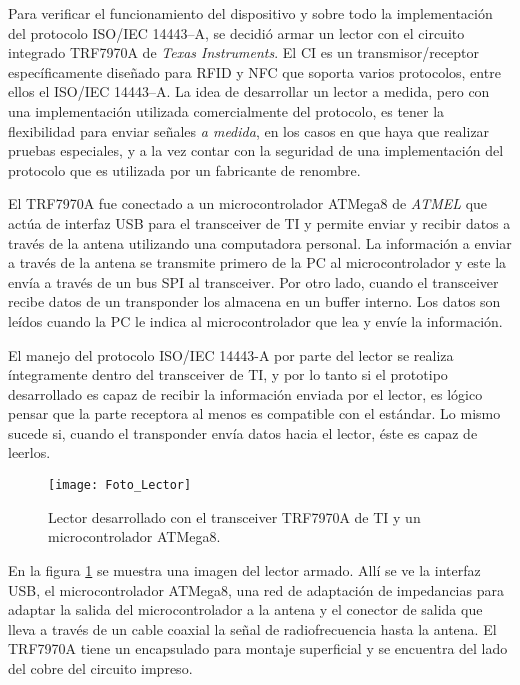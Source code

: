 Para verificar el funcionamiento del dispositivo y sobre todo la 
implementación del protocolo ISO/IEC 14443--A, se decidió armar
un lector con el circuito integrado TRF7970A de \emph{Texas 
Instruments}. El CI es un transmisor/receptor específicamente 
diseñado para RFID y NFC que soporta varios protocolos, entre ellos el 
ISO/IEC 14443--A. La idea de desarrollar un lector a medida, pero 
con una implementación utilizada comercialmente del protocolo, 
es tener la flexibilidad para enviar señales \emph{a medida}, en los 
casos en que haya que realizar pruebas especiales, y a la vez contar 
con la seguridad de una implementación del protocolo que es utilizada 
por un fabricante de renombre.

El TRF7970A fue conectado a un microcontrolador ATMega8 de 
\emph{ATMEL} que actúa de interfaz USB para el transceiver de TI y 
permite enviar y recibir datos a través de la antena utilizando una 
computadora personal. La información a enviar a través de la antena 
se transmite primero de la PC al microcontrolador y este la envía a 
través de un bus SPI al transceiver. Por otro lado, cuando el 
transceiver recibe datos de un transponder los almacena en un buffer 
interno. Los datos son leídos cuando la PC le indica al 
microcontrolador que lea y envíe la información.

El manejo del protocolo ISO/IEC 14443-A por parte del lector se realiza 
íntegramente dentro del transceiver de TI, y por lo tanto si el 
prototipo desarrollado es capaz de recibir la información enviada por 
el lector, es lógico pensar que la parte receptora al menos es 
compatible con el estándar. Lo mismo sucede si, cuando el transponder 
envía datos hacia el lector, éste es capaz de leerlos.

\begin{figure}
	\centering
	\texttt{[image: Foto\_Lector]}
	\caption{Lector desarrollado con el transceiver TRF7970A de TI y 
	un microcontrolador ATMega8.}
	\label{fig:FotoLector}
\end{figure}

En la figura \ref{fig:FotoLector} se muestra una imagen del lector 
armado. Allí se ve la interfaz USB, el microcontrolador ATMega8, una 
red de adaptación de impedancias para adaptar la salida del 
microcontrolador a la antena y el conector de salida que lleva a 
través de un cable coaxial la señal de radiofrecuencia hasta la 
antena. El TRF7970A tiene un encapsulado para montaje superficial y se 
encuentra del lado del cobre del circuito impreso.

